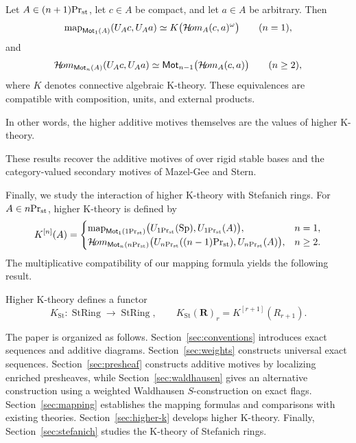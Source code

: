 \begin{theorem}
\label{thm:intro-mapping}
Let $A\in{(n+1)}\mathrm{Pr}_{\mathrm{st}}$, let $c\in A$ be compact,
and let $a\in A$ be arbitrary. Then
\[
 \operatorname{map}_{\mathsf{Mot}_1(A)}(U_Ac,U_Aa)
 \simeq K\bigl(\mathcal{H}\!om_A(c,a)^\omega\bigr)
 \qquad(n=1),
\]
and
\[
 \mathcal{H}\!om_{\mathsf{Mot}_n(A)}(U_Ac,U_Aa)
 \simeq \mathsf{Mot}_{n-1}\bigl(\mathcal{H}\!om_A(c,a)\bigr)
 \qquad(n\geq2),
\]
where $K$ denotes connective algebraic K-theory.
These equivalences are compatible with composition,
units, and external products.
\end{theorem}

In other words, the higher additive motives themselves
are the values of higher K-theory.

These results recover the additive motives of \cite{BGT,HSS}
over rigid stable bases and the category-valued
secondary motives of Mazel-Gee and Stern.

Finally, we study the interaction of higher K-theory
with Stefanich rings. 
For $A\in{n}\mathrm{Pr}_{\mathrm{st}}$, higher K-theory is defined
by
\[
K^{[n]}(A)=
\begin{cases}
\operatorname{map}_{\mathsf{Mot}_1({1}\mathrm{Pr}_{\mathrm{st}})}
\bigl(U_{{1}\mathrm{Pr}_{\mathrm{st}}}(\mathrm{Sp}),U_{{1}\mathrm{Pr}_{\mathrm{st}}}(A)\bigr),
&n=1,\\
\mathcal{H}\!om_{\mathsf{Mot}_n({n}\mathrm{Pr}_{\mathrm{st}})}
\bigl(U_{{n}\mathrm{Pr}_{\mathrm{st}}}({(n-1)}\mathrm{Pr}_{\mathrm{st}}),U_{{n}\mathrm{Pr}_{\mathrm{st}}}(A)\bigr),
&n\geq2.
\end{cases}
\]
The multiplicative compatibility of our
mapping formula yields the following result.

\begin{theorem}
\label{thm:intro-stefanich}
Higher K-theory defines a functor
\[
 K_{\mathrm{St}}:
 \operatorname{StRing}\longrightarrow
 \operatorname{StRing},
 \qquad
 K_{\mathrm{St}}(\mathbf R)_r
 =K^{[r+1]}(R_{r+1}).
\]
\end{theorem}




The paper is organized as follows.
Section~\ref{sec:conventions} introduces exact sequences
and additive diagrams.
Section~\ref{sec:weights} constructs universal exact sequences.
Section~\ref{sec:presheaf} constructs additive motives by
localizing enriched presheaves, while
Section~\ref{sec:waldhausen} gives an alternative construction
using a weighted Waldhausen $S$-construction on exact flags.
Section~\ref{sec:mapping} establishes the mapping formulas
and comparisons with existing theories.
Section~\ref{sec:higher-k} develops higher K-theory.
Finally, Section~\ref{sec:stefanich} studies the K-theory
of Stefanich rings.
